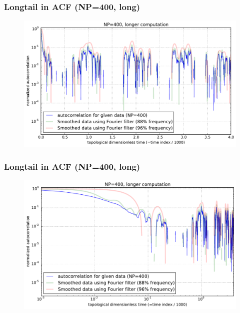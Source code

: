 \documentclass[slidestop, compress, mathserif]{beamer}
\begin{document}
\begin{frame}
  \frametitle<presentation>{Longtail in ACF (NP=400, long)}
  \begin{figure}
    \centering 
    \includegraphics[width=\textwidth]{../longtail_correlation_NP400_semilogy.pdf}
  \end{figure}
\end{frame}

\begin{frame}
  \frametitle<presentation>{Longtail in ACF (NP=400, long)}
  \begin{figure}
    \centering 
    \includegraphics[width=\textwidth]{../longtail_correlation_NP400_loglog.pdf}
  \end{figure}
\end{frame}
\end{document}
